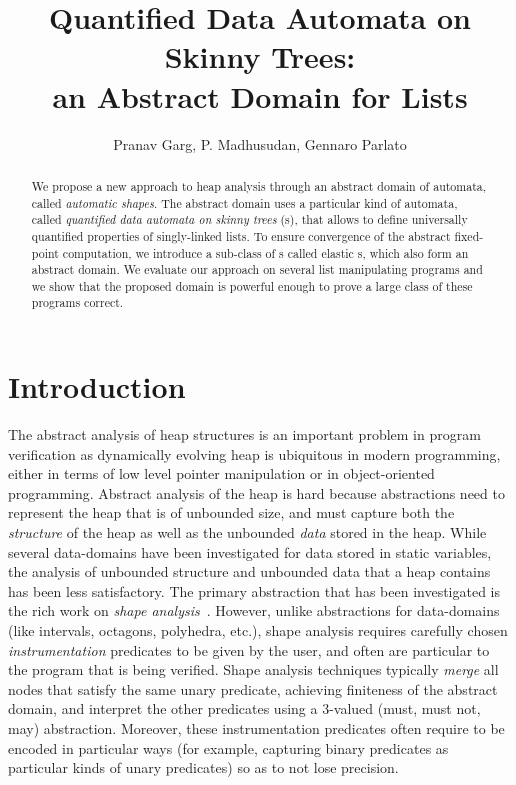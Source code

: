 \documentclass{llncs}
\begin{document}
\title{Quantified Data Automata on Skinny Trees:\\
an Abstract Domain for Lists}


\author{
Pranav Garg, P. Madhusudan, Gennaro Parlato}





\maketitle

\begin{abstract}
We propose a new approach to heap analysis through an abstract domain
of automata, called \emph{automatic shapes}. The abstract domain uses a particular kind of automata, called \emph{quantified data automata on skinny trees} (\QSDA s), that allows to define universally quantified properties of singly-linked lists.
To ensure convergence of the abstract fixed-point computation, we introduce a sub-class of \QSDA s called elastic \QSDA s, which also form an abstract domain.
We evaluate our approach on several list manipulating programs and we show that the proposed domain is powerful enough to prove a large class of these programs correct.
\end{abstract}




\section{Introduction}



The abstract analysis of heap structures is an important problem in program verification as dynamically evolving heap is ubiquitous in modern programming, either in terms of low level pointer manipulation or in object-oriented programming.
Abstract analysis of the heap is hard because abstractions need to represent the heap that is of unbounded size, and must capture both the \emph{structure} of the heap as well as the unbounded \emph{data} stored in the heap. While several data-domains have been investigated for data stored in static variables, the analysis of unbounded structure and unbounded data that a heap contains has been less satisfactory. The primary abstraction that has been investigated is the rich work on \emph{shape analysis}~\cite{shapeanalysis}. However, unlike abstractions for data-domains (like intervals, octagons, polyhedra, etc.), shape analysis requires carefully chosen \emph{instrumentation} predicates to be given by the user, and often are particular to the program that is being verified. Shape analysis techniques typically \emph{merge} all nodes that satisfy the same unary predicate, achieving finiteness of the abstract domain, and interpret the other predicates using a 3-valued (must, must not, may) abstraction. Moreover, these instrumentation predicates often require to be encoded in particular ways
(for example, capturing binary predicates as particular kinds of unary predicates) so as to not lose precision.
\end{document}
